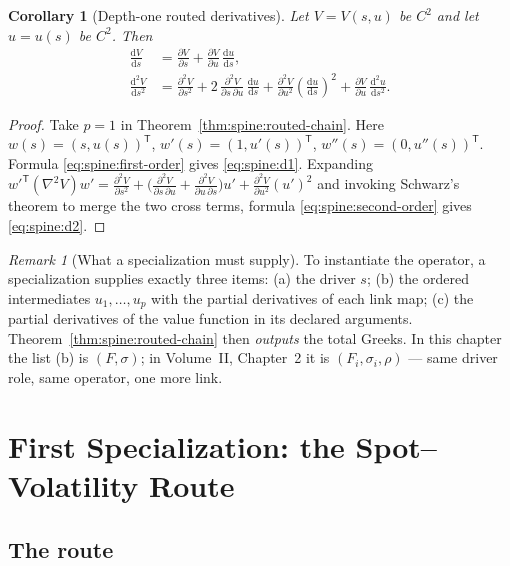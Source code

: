 \documentclass[11pt]{book}
\theoremstyle{plain}
\newtheorem{corollary}[theorem]{Corollary}
\theoremstyle{definition}
\theoremstyle{remark}
\newtheorem{remark}[theorem]{Remark}
\newcommand{\dd}{\mathrm{d}}                                  %
\newcommand{\pd}[2]{\frac{\partial #1}{\partial #2}}          %
\newcommand{\pdd}[2]{\frac{\partial^2 #1}{\partial #2^2}}     %
\newcommand{\pdc}[3]{\frac{\partial^2 #1}{\partial #2\,\partial #3}} %
\newcommand{\td}[2]{\frac{\dd #1}{\dd #2}}                    %
\begin{document}
\begin{corollary}[Depth-one routed derivatives]\label{cor:spine:depth-one}
Let $V = V(s, u)$ be $C^2$ and let $u = u(s)$ be $C^2$. Then
\begin{align}
  \td{V}{s} &= \pd{V}{s} + \pd{V}{u}\,\td{u}{s},
    \label{eq:spine:d1}\\[2pt]
  \frac{\dd^2 V}{\dd s^2}
  &= \pdd{V}{s}
   + 2\,\pdc{V}{s}{u}\,\td{u}{s}
   + \pdd{V}{u}\left(\td{u}{s}\right)^{\!2}
   + \pd{V}{u}\,\frac{\dd^2 u}{\dd s^2}.
    \label{eq:spine:d2}
\end{align}
\end{corollary}

\begin{proof}
Take $p = 1$ in Theorem~\ref{thm:spine:routed-chain}. Here
$w(s) = (s, u(s))^{\mathsf T}$, $w'(s) = (1, u'(s))^{\mathsf T}$,
$w''(s) = (0, u''(s))^{\mathsf T}$. Formula \eqref{eq:spine:first-order} gives
\eqref{eq:spine:d1}. Expanding
$w'^{\mathsf T} (\nabla^2 V) w'
 = \pdd{V}{s} + \bigl(\pdc{V}{s}{u} + \pdc{V}{u}{s}\bigr) u'
 + \pdd{V}{u} (u')^2$
and invoking Schwarz's theorem to merge the two cross terms, formula
\eqref{eq:spine:second-order} gives \eqref{eq:spine:d2}.
\end{proof}

\begin{remark}[What a specialization must supply]\label{rem:spine:interface}
To instantiate the operator, a specialization supplies exactly three items:
(a) the driver $s$; (b) the ordered intermediates $u_1, \ldots, u_p$ with the
partial derivatives of each link map; (c) the partial derivatives of the value
function in its declared arguments. Theorem~\ref{thm:spine:routed-chain} then
\emph{outputs} the total Greeks. In this chapter the list (b) is
$(F, \sigma)$; in Volume~II, Chapter~2 it is $(F_i, \sigma_i, \rho)$ ---
same driver role, same operator, one more link.
\end{remark}

\section{First Specialization: the Spot--Volatility Route}\label{sec:spine:spot-vol}

\subsection{The route}\label{sec:spine:the-route}
\end{document}
